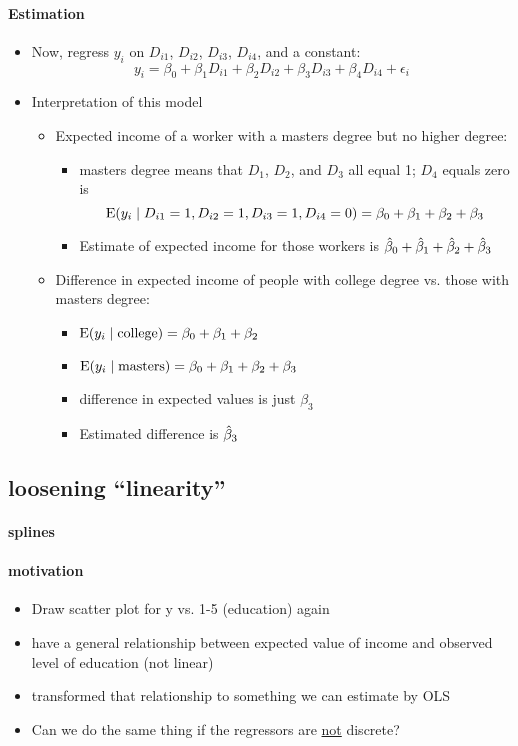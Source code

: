 \paragraph{Estimation}
\begin{itemize}
\item Now, regress $y_i$ on $D_{i1}$, $D_{i2}$, $D_{i3}$, $D_{i4}$, and a constant:
  \[ y_i = \beta_0 + \beta_1 D_{i1} + \beta_2 D_{i2} + \beta_3 D_{i3} + \beta_4 D_{i4} + \epsilon_i \]
\item Interpretation of this model
\begin{itemize}
\item Expected income of a worker with a masters degree but no
          higher degree:
\begin{itemize}
\item masters degree means that $D_1$, $D_2$, and $D_3$ all equal 1;
  $D_4$ equals zero is
  \[
  \operatorname{E}(y_i \mid D_{i1}=1,D_{i2}=1,D_{i3}=1,D_{i4}=0) = \beta_0 + \beta_1 + \beta_2 + \beta_3
  \]
\item Estimate of expected income for those workers is
  $\hat{\beta}_0 + \hat{\beta}_1 + \hat{\beta}_2 + \hat{\beta}_3$
\end{itemize}
\item Difference in expected income of people with college degree
          vs. those with masters degree:
\begin{itemize}
\item $\operatorname{E}(y_i \mid \text{college}) = \beta_0 + \beta_1 + \beta_2$
\item $\operatorname{E}(y_i \mid \text{masters}) = \beta_0 + \beta_1 + \beta_2 + \beta_3$
\item difference in expected values is just $\beta_3$
\item Estimated difference is $\hat{\beta}_3$
\end{itemize}
\end{itemize}
\end{itemize}

\subsection{loosening ``linearity''}

\paragraph{splines}

\paragraph{motivation}
\begin{itemize}
\item Draw scatter plot for y vs. 1-5 (education) again
\item have a general relationship between expected value of income
         and observed level of education (not linear)
\item transformed that relationship to something we can estimate by
         OLS
\item Can we do the same thing if the regressors are \underline{not}
         discrete?
\end{itemize}


